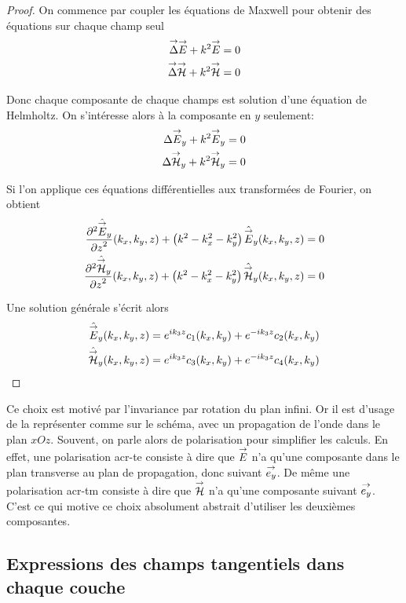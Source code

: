     \begin{proof}
        On commence par coupler les équations de Maxwell pour obtenir des équations sur chaque champ seul
        \begin{align}
            \vlapl{\vE} + k^2 \vE & = 0
            \\
            \vlapl{\vH} + k^2 \vH & = 0
        \end{align}

        Donc chaque composante de chaque champs est solution d'une équation de Helmholtz. On s’intéresse alors à la composante en \(y\) seulement:
        \begin{align}
            \lapl{\vE_y} + k^2 \vE_y & = 0
            \\
            \lapl{\vH_y} + k^2 \vH_y & = 0
        \end{align}

        Si l'on applique ces équations différentielles aux transformées de Fourier, on obtient
        \begin{align}
            \ddr[2]{z}{\hat{\vE}_y}(k_x,k_y,z) + \left( k^2 - k_x^2 - k_y^2\right) \hat{\vE}_y(k_x,k_y,z) & = 0
            \\
            \ddr[2]{z}{\hat{\vH}_y}(k_x,k_y,z) + \left( k^2 - k_x^2 - k_y^2\right) \hat{\vH}_y(k_x,k_y,z) & = 0
        \end{align}

        Une solution générale s'écrit alors
        \begin{align}
            \hat{\vE}_y(k_x,k_y,z) & = e^{ik_3z}c_1(k_x,k_y) + e^{-ik_3z}c_2(k_x,k_y)
            \\
            \hat{\vH}_y(k_x,k_y,z) & = e^{ik_3z}c_3(k_x,k_y) + e^{-ik_3z}c_4(k_x,k_y)
        \end{align}
    \end{proof}

    Ce choix est motivé par l'invariance par rotation du plan infini. Or il est d'usage de la représenter comme sur le schéma, avec un propagation de l'onde dans le plan \(xOz\). Souvent, on parle alors de polarisation pour simplifier les calculs. En effet, une polarisation \gls{acr-te} consiste à dire que \(\vE\) n'a qu'une composante dans le plan transverse au plan de propagation, donc suivant \(\vect{e_y}\). De même une polarisation \gls{acr-tm} consiste à dire que \(\vH\) n'a qu'une composante suivant \(\vect{e_y}\). C'est ce qui motive ce choix absolument abstrait d'utiliser les deuxièmes composantes.

    \subsection{Expressions des champs tangentiels dans chaque couche}

